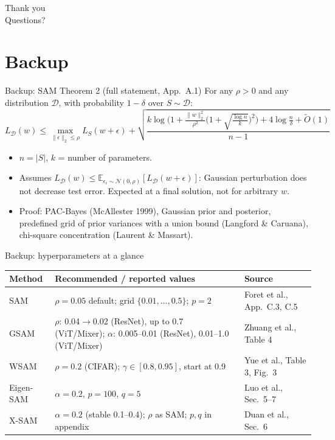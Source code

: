 \documentclass[aspectratio=169,10pt]{beamer}
\newcommand{\sectioninfo}{}
\newcommand{\sectionidea}{}
\newcommand{\partsection}[3]{%
  \renewcommand{\sectioninfo}{#2}%
  \renewcommand{\sectionidea}{#3}%
  \section{#1}}
\newcommand{\norm}[1]{\lVert #1\rVert}
\begin{document}
{
\begin{frame}[standout]
Thank you\\[0.6em]
{\normalsize Questions?}
\end{frame}
}

\appendix
\partsection{Backup}{Full statements and hyperparameters}{}

\begin{frame}{Backup: SAM Theorem 2 (full statement, App.\ A.1)}
For any $\rho>0$ and any distribution $\mathcal D$, with probability $1-\delta$ over $S\sim\mathcal D$:
\[
L_{\mathcal D}(w) \le \max_{\norm{\epsilon}_2\le\rho} L_S(w+\epsilon)
+ \sqrt{\frac{k\log\!\Big(1+\frac{\norm{w}_2^2}{\rho^2}\big(1+\sqrt{\tfrac{\log n}{k}}\big)^2\Big) + 4\log\frac n\delta + \tilde O(1)}{n-1}}
\]
\begin{itemize}
  \item $n=|S|$, $k$ = number of parameters.
  \item Assumes $L_{\mathcal D}(w)\le\mathbb E_{\epsilon_i\sim\mathcal N(0,\rho)}[L_{\mathcal D}(w+\epsilon)]$: Gaussian perturbation does not decrease test error. Expected at a final solution, not for arbitrary $w$.
  \item Proof: PAC-Bayes (McAllester 1999), Gaussian prior and posterior, predefined grid of prior variances with a union bound (Langford \& Caruana), chi-square concentration (Laurent \& Massart).
\end{itemize}
\end{frame}

\begin{frame}{Backup: hyperparameters at a glance}
\centering\small
\renewcommand{\arraystretch}{1.3}
\begin{tabular}{@{}l>{\raggedright}p{8.4cm}>{\raggedright\arraybackslash}p{3.4cm}@{}}
\toprule
Method & Recommended / reported values & Source\\
\midrule
SAM & $\rho=0.05$ default; grid $\{0.01,\dots,0.5\}$; $p=2$ & Foret et al., App.\ C.3, C.5\\
GSAM & $\rho$: 0.04$\to$0.02 (ResNet), up to 0.7 (ViT/Mixer); $\alpha$: 0.005--0.01 (ResNet), 0.01--1.0 (ViT/Mixer) & Zhuang et al., Table 4\\
WSAM & $\rho=0.2$ (CIFAR); $\gamma\in[0.8,0.95]$, start at 0.9 & Yue et al., Table 3, Fig.\ 3\\
Eigen-SAM & $\alpha=0.2$, $p=100$, $q=5$ & Luo et al., Sec.\ 5--7\\
X-SAM & $\alpha=0.2$ (stable 0.1--0.4); $\rho$ as SAM; $p,q$ in appendix & Duan et al., Sec.\ 6\\
\bottomrule
\end{tabular}
\end{frame}
\end{document}
